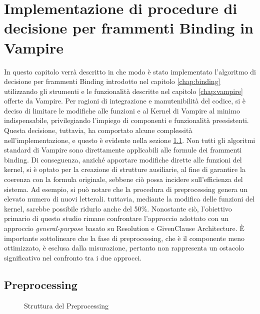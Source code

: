 \documentclass[./main.tex]{subfiles}
\begin{document}
\newcommand{\ob}{\textit{1B} }
\newcommand{\fb}{$\forall$\textit{1B} }
\newcommand{\cb}{\textit{CB} }
\newcommand{\dbb}{\textit{DB} }

\chapter{Implementazione di procedure di decisione per frammenti Binding in Vampire}
In questo capitolo verrà descritto in che modo è stato implementato l'algoritmo di decisione per frammenti Binding 
introdotto nel capitolo \ref{chap:binding} utilizzando gli strumenti 
e le funzionalità descritte nel capitolo \ref{chap:vampire} offerte da Vampire.
Per ragioni di integrazione e manutenibilità del codice,
si è deciso di limitare le modifiche alle funzioni e al Kernel di Vampire al minimo indispensabile, 
privilegiando l'impiego di componenti e funzionalità preesistenti. 
Questa decisione, tuttavia, ha comportato alcune complessità nell'implementazione, 
e questo è evidente nella sezione \ref{sec:preprocessing}. 
Non tutti gli algoritmi standard di Vampire sono direttamente applicabili alle formule dei frammenti binding. 
Di conseguenza, anziché apportare modifiche dirette alle funzioni del kernel, 
si è optato per la creazione di strutture ausiliarie, al fine di garantire la coerenza con la formula originale,
sebbene ciò possa incidere sull'efficienza del sistema. 
Ad esempio, si può notare che la procedura di preprocessing genera un elevato numero di nuovi letterali. 
tuttavia, mediante la modifica delle funzioni del kernel, sarebbe possibile ridurlo anche del 50\%.
Nonostante ciò, l'obiettivo primario di questo studio rimane confrontare l'approccio adottato con un approccio
\textit{general-purpose} basato su Resolution e GivenClause Architecture. 
È importante sottolineare che la fase di preprocessing, che è il componente meno ottimizzato,
è esclusa dalla misurazione, 
pertanto non rappresenta un ostacolo significativo nel confronto tra i due approcci.



\section{Preprocessing} \label{sec:preprocessing}

\begin{figure}[H]
    \centering
    \scalebox{0.55}{
        
    }
    \caption{Struttura del Preprocessing}
    \label{fig:preprocessing}
\end{figure}
\end{document}
